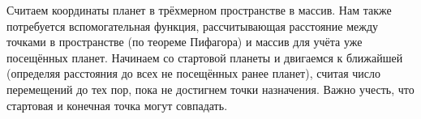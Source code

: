 \solutionSection

Считаем координаты планет в трёхмерном пространстве в массив. Нам также потребуется вспомогательная функция, рассчитывающая расстояние между точками в пространстве (по теореме Пифагора) и массив для учёта уже посещённых планет. Начинаем со стартовой планеты и двигаемся к ближайшей (определяя расстояния до всех не посещённых ранее планет), считая число перемещений до тех пор, пока не достигнем точки назначения. Важно учесть, что стартовая и конечная точка могут совпадать.

\codeExample

